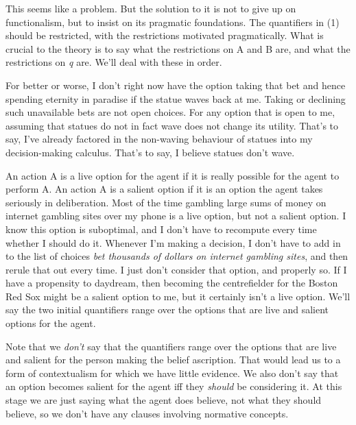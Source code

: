 \documentclass[
  11pt,
  letterpaper,
  DIV=11,
  numbers=noendperiod,
  twoside]{scrartcl}
\begin{document}
This seems like a problem. But the solution to it is not to give up on
functionalism, but to insist on its pragmatic foundations. The
quantifiers in (1) should be restricted, with the restrictions motivated
pragmatically. What is crucial to the theory is to say what the
restrictions on A and B are, and what the restrictions on \emph{q} are.
We'll deal with these in order.

For better or worse, I don't right now have the option taking that bet
and hence spending eternity in paradise if the statue waves back at me.
Taking or declining such unavailable bets are not open choices. For any
option that is open to me, assuming that statues do not in fact wave
does not change its utility. That's to say, I've already factored in the
non-waving behaviour of statues into my decision-making calculus. That's
to say, I believe statues don't wave.

An action A is a live option for the agent if it is really possible for
the agent to perform A. An action A is a salient option if it is an
option the agent takes seriously in deliberation. Most of the time
gambling large sums of money on internet gambling sites over my phone is
a live option, but not a salient option. I know this option is
suboptimal, and I don't have to recompute every time whether I should do
it. Whenever I'm making a decision, I don't have to add in to the list
of choices \emph{bet thousands of dollars on internet gambling sites},
and then rerule that out every time. I just don't consider that option,
and properly so. If I have a propensity to daydream, then becoming the
centrefielder for the Boston Red Sox might be a salient option to me,
but it certainly isn't a live option. We'll say the two initial
quantifiers range over the options that are live and salient options for
the agent.

Note that we \emph{don't} say that the quantifiers range over the
options that are live and salient for the person making the belief
ascription. That would lead us to a form of contextualism for which we
have little evidence. We also don't say that an option becomes salient
for the agent iff they \emph{should} be considering it. At this stage we
are just saying what the agent does believe, not what they should
believe, so we don't have any clauses involving normative concepts.
\end{document}
